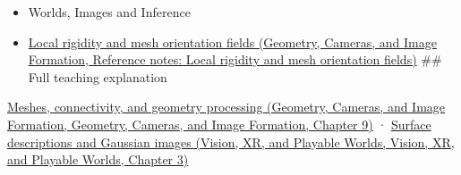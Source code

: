 \begin{itemize}
\item
  {Worlds, Images and Inference}
\item
  \href{../03-Geometry-Cameras-and-Image-Formation/main.pdf\#nameddest=appendix-7107009c505b}{Local rigidity and mesh orientation fields (Geometry, Cameras, and Image Formation, Reference notes: Local rigidity and mesh orientation fields)} \#\# Full teaching explanation
\end{itemize}

\href{../03-Geometry-Cameras-and-Image-Formation/main.pdf\#nameddest=03-visual-computing-i-ch002-meshes-connectivity-and-geometry-processing}{Meshes, connectivity, and geometry processing (Geometry, Cameras, and Image Formation, Geometry, Cameras, and Image Formation, Chapter 9)} · \href{../07-Vision-XR-and-Playable-Worlds/main.pdf\#nameddest=04-visual-computing-ii-ch032-surface-descriptions-and-gaussian-images}{Surface descriptions and Gaussian images (Vision, XR, and Playable Worlds, Vision, XR, and Playable Worlds, Chapter 3)}
